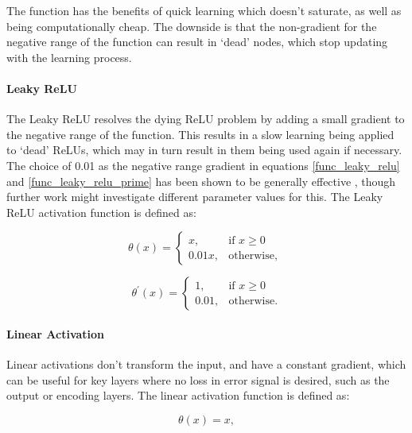 \documentclass[a4paper,11pt,oneside]{article}
\theoremstyle{plain}
\theoremstyle{definition}
\begin{document}
	The function has the benefits of quick learning which doesn't saturate, as well as being computationally cheap. The downside is that the non-gradient for the negative range of the function can result in `dead' nodes, which stop updating with the learning process.
	
	\paragraph{Leaky ReLU}
	
	The Leaky ReLU resolves the dying ReLU problem by adding a small gradient to the negative range of the function. This results in a slow learning being applied to `dead' ReLUs, which may in turn result in them being used again if necessary. The choice of 0.01 as the negative range gradient in equations \eqref{func_leaky_relu} and \eqref{func_leaky_relu_prime} has been shown to be generally effective \citep{Maas}, though further work might investigate different parameter values for this. The Leaky ReLU activation function is defined as:
	

	\[
	\theta(x)= 
	\begin{cases}
	x,& \text{if } x\geq 0\\
	0.01x,              & \text{otherwise, }
	\end{cases}
	\]
	\begin{equation}\label{func_leaky_relu}
	\end{equation}
	
	\[
	\theta^\prime(x)= 
	\begin{cases}
	1,& \text{if } x\geq 0\\
	0.01,              & \text{otherwise.}
	\end{cases}
	\]
		\begin{equation}\label{func_leaky_relu_prime}
	\end{equation}
	
	\paragraph{Linear Activation}
	
	Linear activations don't transform the input, and have a constant gradient, which can be useful for key layers where no loss in error signal is desired, such as the output or encoding layers. The linear activation function is defined as:
	
	\begin{equation}\label{func_linear}
	\theta(x) = x, 
	\end{equation}
	
\end{document}
